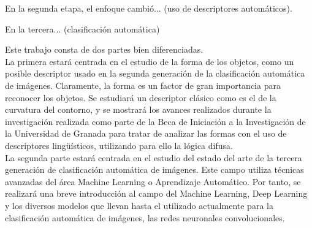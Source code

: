 En la segunda etapa, el enfoque cambió... (uso de descriptores automáticos).

En la tercera... (clasificación automática)

Este trabajo consta de dos partes bien diferenciadas.\\

La primera estará centrada en el estudio de la forma de los objetos, como un posible descriptor usado en la segunda generación de la clasificación automática de imágenes. Claramente, la forma es un factor de gran importancia para reconocer los objetos. Se estudiará un descriptor clásico como es el de la curvatura del contorno, y se mostrará los avances realizados durante la investigación realizada como parte de la Beca de Iniciación a la Investigación de la Universidad de Granada para tratar de analizar las formas con el uso de descriptores lingüísticos, utilizando para ello la lógica difusa.\\

La segunda parte estará centrada en el estudio del estado del arte de la tercera generación de clasificación automática de imágenes. Este campo utiliza técnicas avanzadas del área Machine Learning o Aprendizaje Automático. Por tanto, se realizará una breve introducción al campo del Machine Learning, Deep Learning y los diversos modelos que llevan hasta el utilizado actualmente para la clasificación automática de imágenes, las redes neuronales convolucionales.\\

